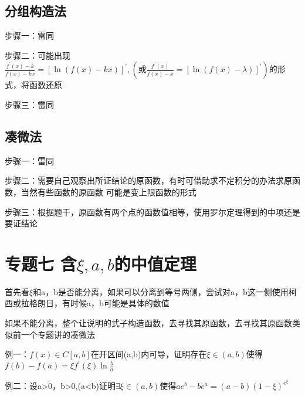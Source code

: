 \documentclass[a4paper,11pt]{book}
\begin{document}
\subsection*{分组构造法}

步骤一：雷同

\vspace{2ex}

\noindent 步骤二：可能出现 $\displaystyle{\frac{f^{\prime}(x)-k}{f(x)-kx}=\left[\ln (f(x)-kx)\right]^{\prime}},(\text{或}\frac{f^{\prime}(x)}{f(x)-x}=\left[\ln (f(x)-\lambda) \right]^{\prime})$的形式，将函数还原

\vspace{2ex}

\noindent 步骤三：雷同

\subsection*{凑微法}

步骤一：雷同

\vspace{2ex}

\noindent 步骤二：需要自己观察出所证结论的原函数，有时可借助求不定积分的办法求原函数，当然有些函数的原函数
可能是变上限函数的形式

\vspace{2ex}

\noindent 步骤三：根据题干，原函数有两个点的函数值相等，使用罗尔定理得到的中项还是要证结论

\section*{专题七 \quad 含$\xi,a,b$的中值定理 }

首先看$\xi$和a，b是否能分离，如果可以分离到等号两侧，尝试对a，b这一侧使用柯西或拉格朗日，有时候a，b可能是具体的数值

\vspace{1ex}

\noindent 如果不能分离，整个让说明的式子构造函数，去寻找其原函数，去寻找其原函数类似前一个专题讲的凑微法

\vspace{2ex}

例一：$f(x)\in C[a,b]$在开区间(a,b)内可导，证明存在$\xi \in (a,b)$使得
$f(b)-f(a)=\xi f^{\prime}(\xi) \ln \frac{b}{a}$

例二：设a>0，b>0,(a<b)证明$\exists \xi \in (a,b)$使得$a e^{b}-b e^{a}=(a-b)(1-\xi )^{e^{\xi }}$
\end{document}
